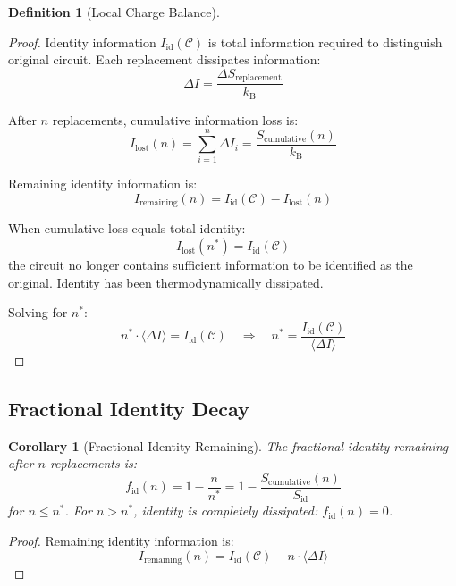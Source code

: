 \documentclass[12pt,a4paper]{article}
\theoremstyle{plain}
\newtheorem{corollary}[theorem]{Corollary}
\theoremstyle{definition}
\newtheorem{definition}[theorem]{Definition}
\theoremstyle{remark}
\newcommand{\kB}{k_{\mathrm{B}}}
\begin{document}
\begin{definition}[Local Charge Balance]
\begin{proof}
Identity information $I_{\text{id}}(\mathcal{C})$ is total information required to distinguish original circuit. Each replacement dissipates information:
\begin{equation}
\Delta I = \frac{\Delta S_{\text{replacement}}}{\kB}
\end{equation}

After $n$ replacements, cumulative information loss is:
\begin{equation}
I_{\text{lost}}(n) = \sum_{i=1}^{n} \Delta I_i = \frac{S_{\text{cumulative}}(n)}{\kB}
\end{equation}

Remaining identity information is:
\begin{equation}
I_{\text{remaining}}(n) = I_{\text{id}}(\mathcal{C}) - I_{\text{lost}}(n)
\end{equation}

When cumulative loss equals total identity:
\begin{equation}
I_{\text{lost}}(n^*) = I_{\text{id}}(\mathcal{C})
\end{equation}
the circuit no longer contains sufficient information to be identified as the original. Identity has been thermodynamically dissipated.

Solving for $n^*$:
\begin{equation}
n^* \cdot \langle \Delta I \rangle = I_{\text{id}}(\mathcal{C}) \quad \Rightarrow \quad n^* = \frac{I_{\text{id}}(\mathcal{C})}{\langle \Delta I \rangle}
\end{equation}
\end{proof}

\subsection{Fractional Identity Decay}

\begin{corollary}[Fractional Identity Remaining]
\label{cor:fractional_identity}
The fractional identity remaining after $n$ replacements is:
\begin{equation}
f_{\text{id}}(n) = 1 - \frac{n}{n^*} = 1 - \frac{S_{\text{cumulative}}(n)}{S_{\text{id}}}
\end{equation}
for $n \leq n^*$. For $n > n^*$, identity is completely dissipated: $f_{\text{id}}(n) = 0$.
\end{corollary}

\begin{proof}
Remaining identity information is:
\begin{equation}
I_{\text{remaining}}(n) = I_{\text{id}}(\mathcal{C}) - n \cdot \langle \Delta I \rangle
\end{equation}


\end{proof}
\end{definition}
\end{document}
